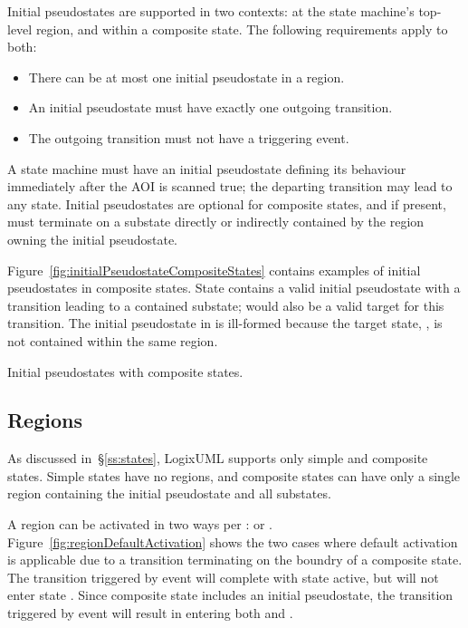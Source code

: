Initial pseudostates are supported in two contexts: at the state machine's
top-level region, and within a composite state. The following requirements
apply to both:

\begin{itemize}
  \item There can be at most one initial pseudostate in a region.

  \item An initial pseudostate must have exactly one outgoing transition.

  \item The outgoing transition must not have a triggering event.
\end{itemize}

A state machine must have an initial pseudostate defining its behaviour
immediately after the AOI is scanned true; the departing transition may lead
to any state. Initial pseudostates are optional for composite states,
and if present, must terminate on a substate directly or indirectly contained
by the region owning the initial pseudostate.

Figure~\ref{fig:initialPseudostateCompositeStates} contains examples of
initial pseudostates in composite states. State 
contains a valid initial pseudostate with a transition leading to
a contained substate;  would also be a valid target
for this transition. The initial pseudostate in  is
ill-formed because the target state, , is not contained within
the same region.

               {Initial pseudostates with composite states.}


\subsection{Regions}

As discussed in~\S\ref{ss:states}, LogixUML supports only simple and
composite states. Simple states have no regions, and composite states
can have only a single region containing the initial pseudostate and
all substates.

A region can be activated in two ways per \textcite[\S14.2.3.2]{OMGUML}:
 or
.
Figure~\ref{fig:regionDefaultActivation} shows the two cases where
default activation is applicable due to a transition terminating
on the boundry of a composite state. The transition triggered by
event  will complete with state 
active, but will not enter state .
Since composite state  includes an initial
pseudostate, the transition triggered by event  will
result in entering both  and .

